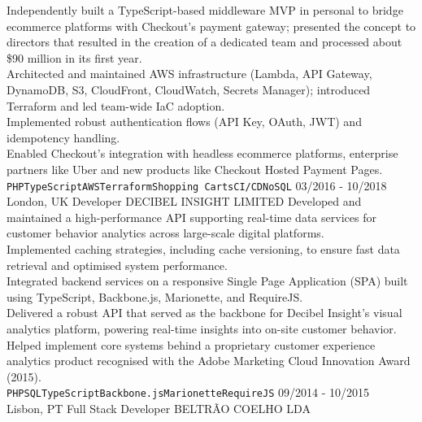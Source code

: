\documentclass[9pt]{lib/developercv} %
\begin{document}
\begin{entrylist}
{			Independently built a TypeScript-based middleware MVP in personal to bridge ecommerce platforms with Checkout's payment gateway; presented the concept to directors that resulted in the creation of a dedicated team and processed about \$90 million in its first year.\\
			Architected and maintained AWS infrastructure (Lambda, API Gateway, DynamoDB, S3, CloudFront, CloudWatch, Secrets Manager); introduced Terraform and led team-wide IaC adoption.\\
			Implemented robust authentication flows (API Key, OAuth, JWT) and idempotency handling.\\
			Enabled Checkout's integration with headless ecommerce platforms, enterprise partners like Uber and new products like Checkout Hosted Payment Pages.\\
			\texttt{PHP}\slashsep\texttt{TypeScript}\slashsep\texttt{AWS}\slashsep\texttt{Terraform}\slashsep\texttt{Shopping Carts}\slashsep\texttt{CI/CD}\slashsep\texttt{NoSQL}
		}
	\entry
		{03/2016 - 10/2018\\\footnotesize{London, UK}}
		{Developer}
		{DECIBEL INSIGHT LIMITED}
		{
			Developed and maintained a high-performance API supporting real-time data services for customer behavior analytics across large-scale digital platforms.\\
			Implemented caching strategies, including cache versioning, to ensure fast data retrieval and optimised system performance.\\
			Integrated backend services on a responsive Single Page Application (SPA) built using TypeScript, Backbone.js, Marionette, and RequireJS.\\
			Delivered a robust API that served as the backbone for Decibel Insight's visual analytics platform, powering real-time insights into on-site customer behavior.\\
			Helped implement core systems behind a proprietary customer experience analytics product recognised with the Adobe Marketing Cloud Innovation Award (2015).\\
			\texttt{PHP}\slashsep\texttt{SQL}\slashsep\texttt{TypeScript}\slashsep\texttt{Backbone.js}\slashsep\texttt{Marionette}\slashsep\texttt{RequireJS}
		}
	\entry
		{09/2014 - 10/2015\\\footnotesize{Lisbon, PT}}
		{Full Stack Developer}
		{BELTRÃO COELHO LDA}
		{

}
\end{entrylist}
\end{document}
